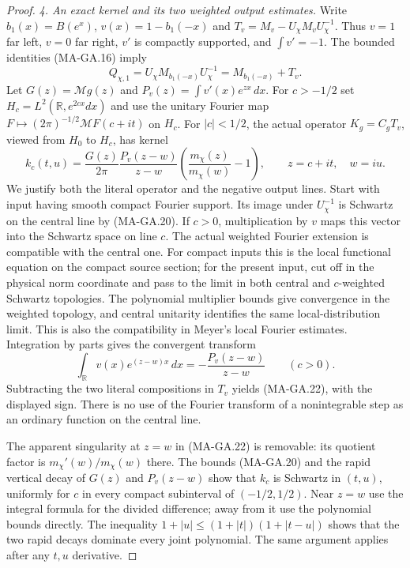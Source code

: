 \begin{proof}
\emph{4. An exact kernel and its two weighted output estimates.}
Write $b_1(x)=B(e^x)$, $v(x)=1-b_1(-x)$ and
$T_v=M_v-U_\chi M_vU_\chi^{-1}$.  Thus $v=1$ far left,
$v=0$ far right, $v'$ is compactly supported, and
$\int v'=-1$.  The bounded identities (MA-GA.16) imply
\[
 Q_{\chi,1}=U_\chi M_{b_1(-x)}U_\chi^{-1}
                =M_{b_1(-x)}+T_v.
 \tag{MA-GA.21}
\]
Let $G(z)=\mathcal Mg(z)$ and
$P_v(z)=\int v'(x)e^{zx}\,dx$.  For $c>-1/2$ set
$H_c=L^2(\mathbb R,e^{2cx}dx)$ and use the unitary Fourier
map $F\mapsto(2\pi)^{-1/2}\mathcal M F(c+it)$ on $H_c$.
For $|c|<1/2$, the actual operator $K_g=C_gT_v$, viewed
from $H_0$ to $H_c$, has kernel
\[
 k_c(t,u)=\frac{G(z)}{2\pi}
       \frac{P_v(z-w)}{z-w}
       \left(\frac{m_\chi(z)}{m_\chi(w)}-1\right),
 \qquad z=c+it,\quad w=iu.
 \tag{MA-GA.22}
\]
We justify both the literal operator and the negative
output lines.  Start with input having smooth compact
Fourier support.  Its image under $U_\chi^{-1}$ is
Schwartz on the central line by (MA-GA.20).  If $c>0$,
multiplication by $v$ maps this vector into the Schwartz
space on line $c$.  The actual weighted Fourier extension
is compatible with the central one.  For compact inputs
this is the local functional equation on the compact
source section; for the present input, cut off in the
physical norm coordinate and pass to the limit in both
central and $c$-weighted Schwartz topologies.  The
polynomial multiplier bounds give convergence in the
weighted topology, and central unitarity identifies the
same local-distribution limit.  This is also the
compatibility in Meyer's local Fourier estimates.  Integration by parts gives
the convergent transform
\[
       \int_{\mathbb R}v(x)e^{(z-w)x}\,dx
                      =-\frac{P_v(z-w)}{z-w}
                     \qquad(c>0).
 \tag{MA-GA.23}
\]
Subtracting the two literal compositions in $T_v$ yields
(MA-GA.22), with the displayed sign.  There is no use of
the Fourier transform of a nonintegrable step as an
ordinary function on the central line.

The apparent singularity at $z=w$ in (MA-GA.22) is
removable: its quotient factor is
$m_\chi'(w)/m_\chi(w)$ there.  The bounds (MA-GA.20)
and the rapid vertical decay of $G(z)$ and $P_v(z-w)$
show that $k_c$ is Schwartz in $(t,u)$, uniformly for
$c$ in every compact subinterval of $(-1/2,1/2)$.
Near $z=w$ use the integral formula for the divided
difference; away from it use the polynomial bounds
directly.  The inequality
$1+|u|\leq(1+|t|)(1+|t-u|)$ shows that the two rapid
decays dominate every joint polynomial.  The same
argument applies after any $t,u$ derivative.


\end{proof}

